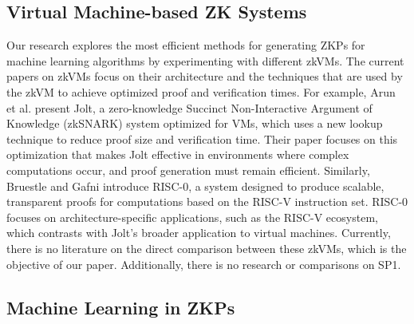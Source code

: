 \documentclass{scrartcl}
\begin{document}

\subsection{Virtual Machine-based ZK Systems}

 Our research explores the most efficient methods for generating ZKPs for machine learning algorithms by experimenting with different zkVMs. The current papers on zkVMs focus on their architecture and the techniques that are used by the zkVM to achieve optimized proof and verification times. For example, Arun et al.\cite{arun2024jolt} present Jolt, a zero-knowledge Succinct Non-Interactive Argument of Knowledge (zkSNARK) system optimized for VMs, which uses a new lookup technique to reduce proof size and verification time. Their paper focuses on this optimization that makes Jolt effective in environments where complex computations occur, and proof generation must remain efficient. Similarly, Bruestle and Gafni\cite{bruestle2023risc} introduce RISC-0, a system designed to produce scalable, transparent proofs for computations based on the RISC-V instruction set. RISC-0 focuses on architecture-specific applications, such as the RISC-V ecosystem, which contrasts with Jolt’s broader application to virtual machines. Currently, there is no literature on the direct comparison between these zkVMs, which is the objective of our paper. Additionally, there is no research or comparisons on SP1. 

\subsection{Machine Learning in ZKPs}
\end{document}
